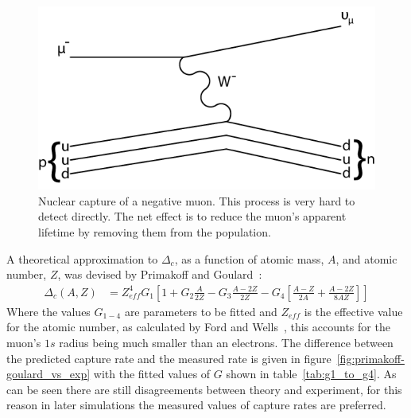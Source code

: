 \begin{figure}[htpb]
  \centering
    \includegraphics[scale=1]{images/nuclear_muon_capture.png}
  \caption{Nuclear capture of a negative muon. This process is very hard to detect directly. The net effect is to reduce the muon's apparent lifetime by removing them from the population.}
  \label{fig:images_nuclear_muon_capture}
\end{figure}

A theoretical approximation to \( \Delta_c \), as a function of atomic mass, \( A \), and atomic number, \( Z \), was devised by Primakoff and Goulard~\cite{goulard_primakoff}:
\begin{align}
  \Delta_c(A,Z)&=Z^4_{eff} G_1 \left[ 1 + G_2 \frac{A}{2Z} - G_3 \frac{A-2Z}{2Z} - G_4 \left[\frac{A-Z}{2A} + \frac{A-2Z}{8AZ} \right] \right]
  \label{eq:primakoff_and_goulard}
\end{align}
Where the values \(G_{1-4}\) are parameters to be fitted and \( Z_{eff} \) is the effective value for the atomic number, as calculated by Ford and Wells~\cite{ford_and_wills_mesonic_atoms}, this accounts for the muon's \( 1s \) radius being much smaller than an electrons. The difference between the predicted capture rate and the measured rate is given in figure~\ref{fig:primakoff-goulard_vs_exp} with the fitted values of \(G\) shown in table~\ref{tab:g1_to_g4}. As can be seen there are still disagreements between theory and experiment, for this reason in later simulations the measured values of capture rates are preferred.

